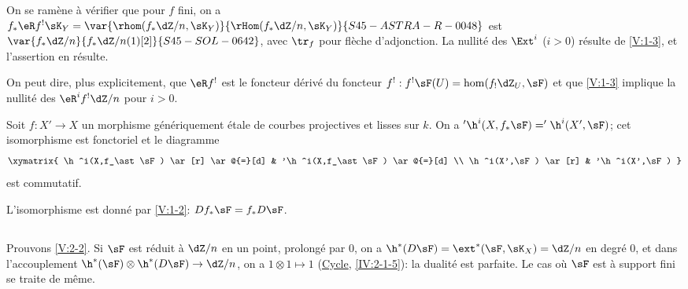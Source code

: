 On se ramène à vérifier que pour $f$ fini, on a 
$f_\ast \eR f^!\sK_Y = \var{\rhom(f_\ast\dZ/n,\sK_Y)}{\rHom(f_\ast\dZ/n,\sK_Y)}{S45-ASTRA-R-0048}$ est $\var{f_\ast\dZ/n}{f_\ast\dZ/n(1)[2]}{S45-SOL-0642}$, avec $\tr_f$ 
pour flèche d'adjonction. La nullité des $\Ext^i$ ($i>0$) résulte de 
\ref{V:1-3}, et l'assertion en résulte. 

On peut dire, plus explicitement, que $\eR f^!$ est le foncteur dérivé du 
foncteur $f^!:f^!\sF(U)=\hom(f_!\dZ_U,\sF)$ et que \ref{V:1-3} implique la 
nullité des $\eR^i f^!\dZ/n$ pour $i>0$.





\begin{corollary_}\label{V:2-4}
Soit $f:X'\to X$ un morphisme génériquement étale de courbes 
projectives et lisses sur $k$. On a $'\h^i(X,f_\ast \sF)='\h^i(X',\sF)$; cet 
isomorphisme est fonctoriel et le diagramme 
\[\xymatrix{
  \h^i(X,f_\ast\sF) \ar[r] \ar@{=}[d] 
    & '\h^i(X,f_\ast\sF) \ar@{=}[d] \\
  \h^i(X',\sF) \ar[r] 
    & '\h^i(X',\sF) 
}\]
est commutatif.
\end{corollary_}

L'isomorphisme est donné par \ref{V:1-2}: $D f_\ast\sF=f_\ast D\sF$. 





\subsection{}\label{V:2-5}

Prouvons \ref{V:2-2}. Si $\sF$ est réduit à $\dZ/n$ en un point, prolongé 
par $0$, on a $\h^*(D\sF) = \ext^*(\sF,\sK_X)=\dZ/n$ en degré 
$0$, et dans l'accouplement $\h^*(\sF)\otimes\h^*(D\sF) \to \dZ/n$, 
on a $1\otimes 1\mapsto 1$ (\hyperref[IV]{Cycle}, \ref{IV:2-1-5}): la dualité 
est parfaite. Le cas où $\sF$ est à support fini se traite de même. 

